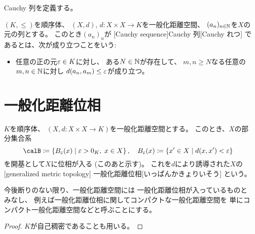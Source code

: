 \documentclass[report]{jlreq}
\begin{document}
Cauchy 列を定義する。

\begin{definition}[Cauchy 列]
    $(K, \le)$を順序体、
    $(X, d), \, d \colon X \times X \to K$を一般化距離空間、
    $(a_n)_{n \in \mathbb{N}}$を$X$の元の列とする。
    このとき$(a_n)_n$が
    [Cauchy sequence]{Cauchy 列}[Cauchy れつ]
    であるとは、次が成り立つことをいう:
    \begin{itemize}
        \item 任意の正の元$\varepsilon \in K$に対し、
            ある$N \in \mathbb{N}$が存在して、
            $m, n \ge N$なる任意の$m, n \in \mathbb{N}$に対し
            $d(a_n, a_m) \le \varepsilon$が成り立つ。
    \end{itemize}
\end{definition}

%
\section{一般化距離位相}

\begin{definition}[一般化距離位相]
    $K$を順序体、
    $(X, d \colon X \times X \to K)$を一般化距離空間とする。
    このとき、$X$の部分集合系
    \begin{equation}
        \calB \coloneqq \mybrace{
            B_{\eps}(x)
            \mid
            \eps > 0_K, \;
            x \in X
        },
        \quad
        B_{\eps}(x) \coloneqq \mybrace{
            x' \in X
            \mid
            d(x, x') < \eps
        }
    \end{equation}
    を開基として$X$に位相が入る (このあと示す)。
    これを$d$により誘導された$X$の
    [generalized metric topology]
        {一般化距離位相}[いっぱんかきょりいそう]
    という。
\end{definition}

\begin{remark}
    今後断りのない限り、一般化距離空間には
    一般化距離位相が入っているものとみなし、
    例えば一般化距離位相に関してコンパクトな一般化距離空間を
    単にコンパクト一般化距離空間などと呼ぶことにする。
\end{remark}

\begin{proof}
    $K$が自己稠密であることも用いる。
    \TODO{}
\end{proof}
\end{document}
